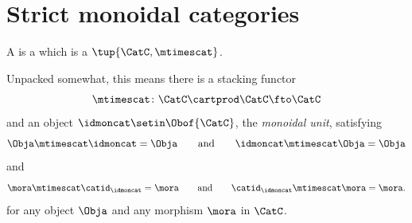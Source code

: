 
\section{Strict monoidal categories}
\label{sec:strict-monoidal-categories}


\begin{ctdefinition}
    \label{def:strict-monoidal-category}
    A  is a  which is a  $\tup{\CatC, \mtimescat}$.

    Unpacked somewhat, this means there is a stacking functor
    \begin{equation}
        \mtimescat \colon \CatC \cartprod \CatC \fto \CatC
    \end{equation}
    and an object $\idmoncat \setin \Obof{\CatC}$, the \emph{monoidal unit}, satisfying
    \begin{equation}
        \Obja \mtimescat \idmoncat = \Obja \qquad \text{and} \qquad \idmoncat \mtimescat \Obja = \Obja
    \end{equation}
    and
    \begin{equation}
        \mora \mtimescat \catid_\idmoncat = \mora \qquad \text{and} \qquad \catid_\idmoncat \mtimescat \mora = \mora.
    \end{equation}
    for any object $\Obja$ and any morphism $\mora$ in $\CatC$.
\end{ctdefinition}



